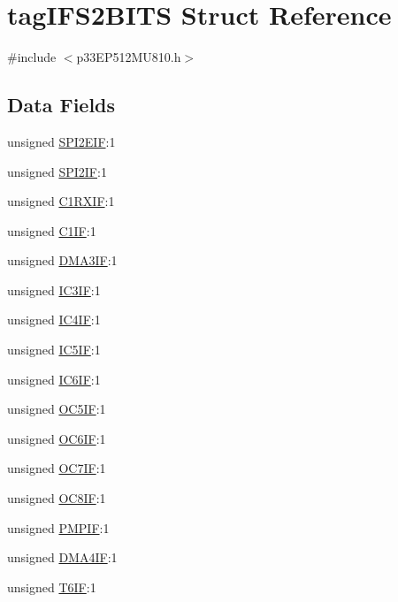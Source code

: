 \hypertarget{structtag_i_f_s2_b_i_t_s}{}\section{tag\+I\+F\+S2\+B\+I\+TS Struct Reference}
\label{structtag_i_f_s2_b_i_t_s}


{\ttfamily \#include $<$p33\+E\+P512\+M\+U810.\+h$>$}

\subsection*{Data Fields}
\begin{DoxyCompactItemize}
\item 
unsigned \hyperlink{structtag_i_f_s2_b_i_t_s_a750601c6f4f449afa992748d5995a423}{S\+P\+I2\+E\+IF}\+:1
\item 
unsigned \hyperlink{structtag_i_f_s2_b_i_t_s_a22ab45434b33c7a393eb4d271cad1885}{S\+P\+I2\+IF}\+:1
\item 
unsigned \hyperlink{structtag_i_f_s2_b_i_t_s_ad8f80a3870a6b2d9c55f3e5cb5be6356}{C1\+R\+X\+IF}\+:1
\item 
unsigned \hyperlink{structtag_i_f_s2_b_i_t_s_aaae9a44bc28f6785ef266e43e416f2b6}{C1\+IF}\+:1
\item 
unsigned \hyperlink{structtag_i_f_s2_b_i_t_s_a4446b306d14669fb782941c229f5203e}{D\+M\+A3\+IF}\+:1
\item 
unsigned \hyperlink{structtag_i_f_s2_b_i_t_s_a299ba5b2c4391e17e575716da79b0279}{I\+C3\+IF}\+:1
\item 
unsigned \hyperlink{structtag_i_f_s2_b_i_t_s_a6127a3a21abbffddec43238566a4c809}{I\+C4\+IF}\+:1
\item 
unsigned \hyperlink{structtag_i_f_s2_b_i_t_s_a24056e0af4c25449bda0a71fc7429975}{I\+C5\+IF}\+:1
\item 
unsigned \hyperlink{structtag_i_f_s2_b_i_t_s_acecec4ffd88fb22eb6ef190ba6c7e66d}{I\+C6\+IF}\+:1
\item 
unsigned \hyperlink{structtag_i_f_s2_b_i_t_s_a9ac1f221b59112031c2c343f614728d9}{O\+C5\+IF}\+:1
\item 
unsigned \hyperlink{structtag_i_f_s2_b_i_t_s_a9efeb20a86815b5de800a4625c3b3ad0}{O\+C6\+IF}\+:1
\item 
unsigned \hyperlink{structtag_i_f_s2_b_i_t_s_abcd386439541c6e64cba11574fea294d}{O\+C7\+IF}\+:1
\item 
unsigned \hyperlink{structtag_i_f_s2_b_i_t_s_a7b6f1bb67c53a1e13572a3764a1b537b}{O\+C8\+IF}\+:1
\item 
unsigned \hyperlink{structtag_i_f_s2_b_i_t_s_a690dfb215da4a7e964007380c928f6e3}{P\+M\+P\+IF}\+:1
\item 
unsigned \hyperlink{structtag_i_f_s2_b_i_t_s_a02197baa4245ebf736eeb23578d7096d}{D\+M\+A4\+IF}\+:1
\item 
unsigned \hyperlink{structtag_i_f_s2_b_i_t_s_a9486c9f3e8731e73cfc1ed85623771db}{T6\+IF}\+:1
\end{DoxyCompactItemize}


